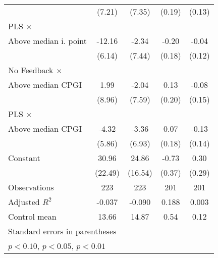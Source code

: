 \begin{table}[htbp]
\begin{tabular}{l*{4}{c}}
                &   (7.21)         &   (7.35)         &   (0.19)         &   (0.13)         \\
\addlinespace
PLS $\times$ \\ Above median i. point&   -12.16\sym{**} &    -2.34         &    -0.20         &    -0.04         \\
                &   (6.14)         &   (7.44)         &   (0.18)         &   (0.12)         \\
\addlinespace
No Feedback $\times$ \\ Above median CPGI&     1.99         &    -2.04         &     0.13         &    -0.08         \\
                &   (8.96)         &   (7.59)         &   (0.20)         &   (0.15)         \\
\addlinespace
PLS $\times$ \\ Above median CPGI&    -4.32         &    -3.36         &     0.07         &    -0.13         \\
                &   (5.86)         &   (6.93)         &   (0.18)         &   (0.14)         \\
\addlinespace
Constant        &    30.96         &    24.86         &    -0.73\sym{*}  &     0.30         \\
                &  (22.49)         &  (16.54)         &   (0.37)         &   (0.29)         \\
\midrule
Observations    &      223         &      223         &      201         &      201         \\
Adjusted \(R^{2}\)&   -0.037         &   -0.090         &    0.188         &    0.003         \\
Control mean    &    13.66         &    14.87         &     0.54         &     0.12         \\
\bottomrule
\multicolumn{5}{l}{\footnotesize Standard errors in parentheses}\\
\multicolumn{5}{l}{\footnotesize \sym{*} \(p<0.10\), \sym{**} \(p<0.05\), \sym{***} \(p<0.01\)}\\
\end{tabular}
\end{table}

